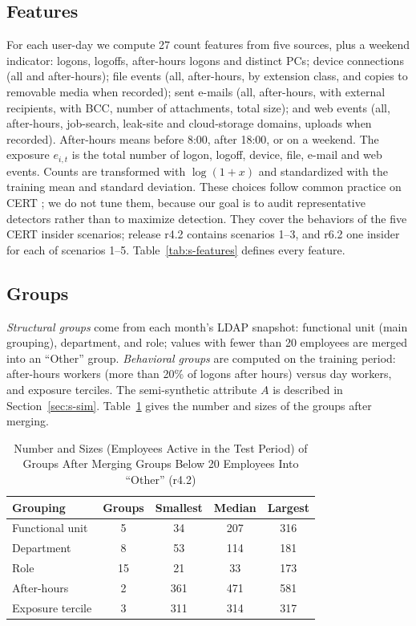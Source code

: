 \documentclass[10pt,onecolumn,letterpaper]{article}
\begin{document}
\subsection{Features}
For each user-day we compute 27 count features from five sources, plus a weekend indicator: logons, logoffs, after-hours logons and distinct PCs; device connections (all and after-hours); file events (all, after-hours, by extension class, and copies to removable media when recorded); sent e-mails (all, after-hours, with external recipients, with BCC, number of attachments, total size); and web events (all, after-hours, job-search, leak-site and cloud-storage domains, uploads when recorded). After-hours means before 8:00, after 18:00, or on a weekend. The exposure $e_{i,t}$ is the total number of logon, logoff, device, file, e-mail and web events. Counts are transformed with $\log(1+x)$ and standardized with the training mean and standard deviation. These choices follow common practice on CERT ; we do not tune them, because our goal is to audit representative detectors rather than to maximize detection. They cover the behaviors of the five CERT insider scenarios; release r4.2 contains scenarios 1--3, and r6.2 one insider for each of scenarios 1--5. Table~\ref{tab:s-features} defines every feature.

\subsection{Groups}
\emph{Structural groups} come from each month's LDAP snapshot: functional unit (main grouping), department, and role; values with fewer than 20 employees are merged into an ``Other'' group. \emph{Behavioral groups} are computed on the training period: after-hours workers (more than 20\% of logons after hours) versus day workers, and exposure terciles. The semi-synthetic attribute $A$ is described in Section~\ref{sec:s-sim}. Table~\ref{tab:s-groups} gives the number and sizes of the groups after merging.

\begin{table}[!t]
\caption{Number and Sizes (Employees Active in the Test Period) of Groups After Merging Groups Below 20 Employees Into ``Other'' (r4.2)\label{tab:s-groups}}
\centering
\setlength{\tabcolsep}{4pt}
\begin{tabular}{lcccc}
\toprule
Grouping & Groups & Smallest & Median & Largest \\
\midrule
Functional unit & 5 & 34 & 207 & 316 \\
Department & 8 & 53 & 114 & 181 \\
Role & 15 & 21 & 33 & 173 \\
After-hours & 2 & 361 & 471 & 581 \\
Exposure tercile & 3 & 311 & 314 & 317 \\
\bottomrule
\end{tabular}
\end{table}
\end{document}
